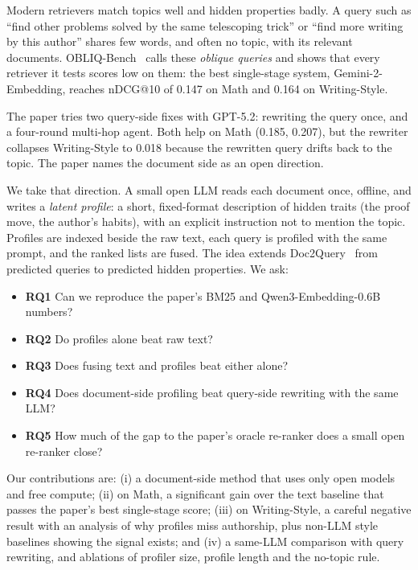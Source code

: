 \documentclass[conference]{IEEEtran}
\begin{document}
Modern retrievers match topics well and hidden properties badly. A query such as ``find other problems solved by the same telescoping trick'' or ``find more writing by this author'' shares few words, and often no topic, with its relevant documents. OBLIQ-Bench~\cite{obliq2026} calls these \emph{oblique queries} and shows that every retriever it tests scores low on them: the best single-stage system, Gemini-2-Embedding, reaches nDCG@10 of 0.147 on Math and 0.164 on Writing-Style.

The paper tries two query-side fixes with GPT-5.2: rewriting the query once, and a four-round multi-hop agent. Both help on Math (0.185, 0.207), but the rewriter collapses Writing-Style to 0.018 because the rewritten query drifts back to the topic. The paper names the document side as an open direction.

We take that direction. A small open LLM reads each document once, offline, and writes a \emph{latent profile}: a short, fixed-format description of hidden traits (the proof move, the author's habits), with an explicit instruction not to mention the topic. Profiles are indexed beside the raw text, each query is profiled with the same prompt, and the ranked lists are fused. The idea extends Doc2Query~\cite{doc2query} from predicted queries to predicted hidden properties. We ask:
\begin{itemize}
\item \textbf{RQ1} Can we reproduce the paper's BM25 and Qwen3-Embedding-0.6B numbers?
\item \textbf{RQ2} Do profiles alone beat raw text?
\item \textbf{RQ3} Does fusing text and profiles beat either alone?
\item \textbf{RQ4} Does document-side profiling beat query-side rewriting with the same LLM?
\item \textbf{RQ5} How much of the gap to the paper's oracle re-ranker does a small open re-ranker close?
\end{itemize}

Our contributions are: (i) a document-side method that uses only open models and free compute; (ii) on Math, a significant gain over the text baseline that passes the paper's best single-stage score; (iii) on Writing-Style, a careful negative result with an analysis of why profiles miss authorship, plus non-LLM style baselines showing the signal exists; and (iv) a same-LLM comparison with query rewriting, and ablations of profiler size, profile length and the no-topic rule.
\end{document}
